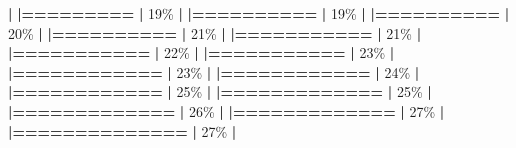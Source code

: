 \documentclass[
]{book}
\newenvironment{Shaded}{\begin{snugshade}}{\end{snugshade}}
\newcommand{\DecValTok}[1]{\textcolor[rgb]{0.00,0.00,0.81}{#1}}
\newcommand{\ErrorTok}[1]{\textcolor[rgb]{0.64,0.00,0.00}{\textbf{#1}}}
\newcommand{\NormalTok}[1]{#1}
\newcommand{\SpecialCharTok}[1]{\textcolor[rgb]{0.81,0.36,0.00}{\textbf{#1}}}
\begin{document}
\begin{Shaded}
\begin{Highlighting}[]
  \SpecialCharTok{|}                                                        
  \ErrorTok{|=========}                                         \ErrorTok{|}  \DecValTok{19}\NormalTok{\%}
  \SpecialCharTok{|}                                                        
  \ErrorTok{|==========}                                        \ErrorTok{|}  \DecValTok{19}\NormalTok{\%}
  \SpecialCharTok{|}                                                        
  \ErrorTok{|==========}                                        \ErrorTok{|}  \DecValTok{20}\NormalTok{\%}
  \SpecialCharTok{|}                                                        
  \ErrorTok{|==========}                                        \ErrorTok{|}  \DecValTok{21}\NormalTok{\%}
  \SpecialCharTok{|}                                                        
  \ErrorTok{|===========}                                       \ErrorTok{|}  \DecValTok{21}\NormalTok{\%}
  \SpecialCharTok{|}                                                        
  \ErrorTok{|===========}                                       \ErrorTok{|}  \DecValTok{22}\NormalTok{\%}
  \SpecialCharTok{|}                                                        
  \ErrorTok{|===========}                                       \ErrorTok{|}  \DecValTok{23}\NormalTok{\%}
  \SpecialCharTok{|}                                                        
  \ErrorTok{|============}                                      \ErrorTok{|}  \DecValTok{23}\NormalTok{\%}
  \SpecialCharTok{|}                                                        
  \ErrorTok{|============}                                      \ErrorTok{|}  \DecValTok{24}\NormalTok{\%}
  \SpecialCharTok{|}                                                        
  \ErrorTok{|============}                                      \ErrorTok{|}  \DecValTok{25}\NormalTok{\%}
  \SpecialCharTok{|}                                                        
  \ErrorTok{|=============}                                     \ErrorTok{|}  \DecValTok{25}\NormalTok{\%}
  \SpecialCharTok{|}                                                        
  \ErrorTok{|=============}                                     \ErrorTok{|}  \DecValTok{26}\NormalTok{\%}
  \SpecialCharTok{|}                                                        
  \ErrorTok{|=============}                                     \ErrorTok{|}  \DecValTok{27}\NormalTok{\%}
  \SpecialCharTok{|}                                                        
  \ErrorTok{|==============}                                    \ErrorTok{|}  \DecValTok{27}\NormalTok{\%}
  \SpecialCharTok{|}                                                        

\end{Highlighting}
\end{Shaded}
\end{document}
